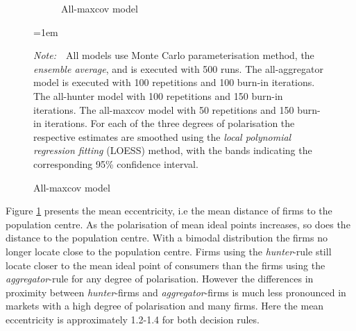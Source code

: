 \documentclass[preprint, 12pt]{elsarticle}
\newcommand{\Figtext}[1]{%
	\begin{tablenotes}[para,flushleft]
		\hangindent=1em
		\footnotesize
		\raggedright
		#1
	\end{tablenotes}
}
\newcommand{\Fignote}[1]{\Figtext{\emph{Note:~}~#1}}
\begin{document}
\begin{figure}[ht!]
\begin{subfigure}[t]{0.315\textwidth}
		\caption{All-maxcov model}
		\label{fig:eccentricity_maxcov}
	\end{subfigure}
	
	\label{fig:asymetric_eccentricity}
		\Fignote{All models use Monte Carlo parameterisation method, the \emph{ensemble average}, and is executed with 500 runs. The all-aggregator model is executed with 100 repetitions and 100 burn-in iterations. The all-hunter model with 100 repetitions and 150 burn-in iterations. The all-maxcov model with 50 repetitions and 150 burn-in iterations. For each of the three degrees of polarisation the respective estimates are smoothed using the \emph{local polynomial regression fitting} (LOESS) method, with the bands indicating the corresponding 95\% confidence interval.}
\end{figure}

Figure \ref{fig:eccentricity_maxcov} presents the mean eccentricity, i.e the mean distance of firms to the population centre. As the polarisation of mean ideal points increases, so does the distance to the population centre. With a bimodal distribution the firms no longer locate close to the population centre. Firms using the \emph{hunter}-rule still locate closer to the mean ideal point of consumers than the firms using the \emph{aggregator}-rule for any degree of polarisation. However the differences in proximity between \emph{hunter}-firms and \emph{aggregator}-firms is much less pronounced in markets with a high degree of polarisation and many firms. Here the mean eccentricity is approximately 1.2-1.4 for both decision rules.
\end{document}
